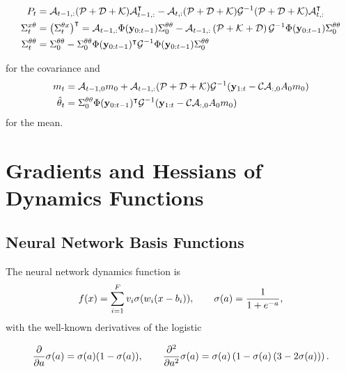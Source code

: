 \begin{fullwidth}\vspace{-\baselineskip}
\begin{subequations}
\begin{align}
  P_t &= \mathcal{A}_{t-1,:}(\mathcal{P} + \mathcal{D} + \mathcal{K})\mathcal{A}_{t-1,:}^{\intercal} - \mathcal{A}_{t,:}(\mathcal{P} + \mathcal{D}
  + \mathcal{K})\mathcal{G}^{-1} (\mathcal{P} + \mathcal{D} + \mathcal{K}) \mathcal{A}_{t,:}^{\intercal} \\
  \Sigma^{x\theta}_t &= \left(\Sigma^{\theta x}_t\right)^{\intercal} = \mathcal{A}_{t-1,:}
\Phi(\mathbf{y}_{0:t-1})
  \Sigma^{\theta\theta}_0
  - \mathcal{A}_{t-1,:} \left( \mathcal{P} + \mathcal{K} + \mathcal{D} \right)
  \mathcal{G}^{-1}\Phi(\mathbf{y}_{0:t-1})\Sigma^{\theta\theta}_0 \\
  \Sigma^{\theta\theta}_t &= \Sigma^{\theta\theta}_0 -
\Sigma^{\theta\theta}_0\Phi(\mathbf{y}_{0:t-1})^{\intercal}
  \mathcal{G}^{-1}\Phi(\mathbf{y}_{0:t-1})\Sigma^{\theta\theta}_0
\end{align}
\end{subequations}
\end{fullwidth}
for the covariance and
\begin{subequations}
\begin{align}
  m_t &= \mathcal{A}_{t-1,0} m_0 + \mathcal{A}_{t-1,:}(\mathcal{P} + \mathcal{D} + \mathcal{K})\mathcal{G}^{-1}
(\mathbf{y}_{1:t} - \mathcal{C}\mathcal{A}_{:,0} A_0 m_0) \\
  \hat{\theta}_t &= \Sigma^{\theta\theta}_0\Phi(\mathbf{y}_{0:t-1})^{\intercal}
\mathcal{G}^{-1}(\mathbf{y}_{1:t} - \mathcal{C}\mathcal{A}_{:,0} A_0 m_0)
\end{align}
\end{subequations}
for the mean.

\section{Gradients and Hessians of Dynamics Functions}
\label{sec:appendix-B}

\subsection{Neural Network Basis Functions}

The neural network dynamics function is
\begin{equation}
  f(x) = \sum_{i=1}^F v_i \sigma(w_i(x-b_i)), \qquad \sigma(a) = \frac{1}{1 + e^{-a}},
\end{equation}
with the well-known derivatives of the logistic
\begin{fullwidth}\vspace{-\baselineskip}
\begin{equation}
  \frac{\partial}{\partial a} \sigma(a) = \sigma(a)(1-\sigma(a)),
  \qquad \frac{\partial^2}{\partial a^2} \sigma(a) =
    \sigma(a)\left(1-\sigma(a)\left(3-2\sigma(a)\right)\right).
\end{equation}
\end{fullwidth}


